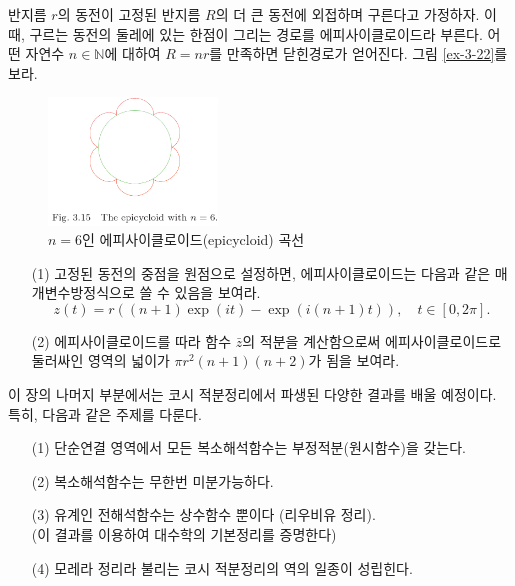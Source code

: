 \begin{salt_exercise} \label{ex-3-22}
반지름 $r$의 동전이 고정된 반지름 $R$의  더 큰 동전에 외접하며 구른다고 가정하자.
이 때, 구르는 동전의 둘레에 있는 한점이 그리는 경로를 에피사이클로이드라 부른다.
어떤 자연수 $n\in\mathbb N$에 대하여 $R=nr$를 만족하면 닫힌경로가 얻어진다.
그림 \ref{ex-3-22}를 보라.

\begin{figure}[!h]
\begin{center}
\includegraphics[width=0.4\textwidth]{./SaltChapter/fig-3-15}
\end{center}
\caption{$n=6$인 에피사이클로이드(epicycloid) 곡선}
\label{fig-3-15}
\end{figure}

\begin{itemize}
\item[(1)] 고정된 동전의 중점을 원점으로 설정하면,
에피사이클로이드는 다음과 같은 매개변수방정식으로 쓸 수 있음을 보여라.
\[
 z(t) = r((n+1)\exp(it) - \exp(i(n+1)t)), \quad t\in [0,2\pi].
\]
\item[(2)] 에피사이클로이드를 따라 함수 $\bar z$의 적분을 계산함으로써
에피사이클로이드로 둘러싸인 영역의 넓이가 $\pi r^2(n+1)(n+2)$가 됨을 보여라.
\end{itemize}
\end{salt_exercise}

이 장의 나머지 부분에서는
코시 적분정리에서 파생된 다양한 결과를 배울 예정이다.
특히, 다음과 같은 주제를 다룬다.

\begin{itemize}
\item[(1)] 단순연결 영역에서 모든 복소해석함수는 부정적분(원시함수)을 갖는다.
\item[(2)] 복소해석함수는 무한번 미분가능하다.
\item[(3)] 유계인 전해석함수는 상수함수 뿐이다 (리우비유 정리).  \\
(이 결과를 이용하여 대수학의 기본정리를 증명한다)
\item[(4)] 모레라 정리라 불리는 코시 적분정리의 역의 일종이 성립힌다.
\end{itemize}

